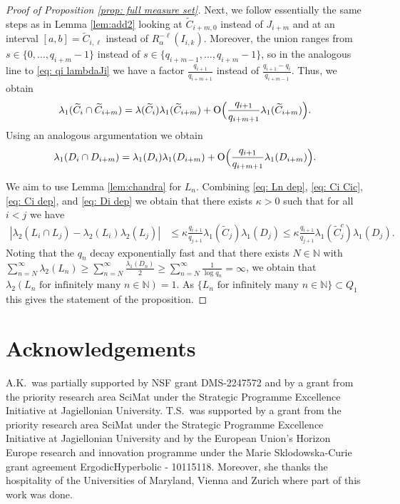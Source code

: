 \documentclass[11pt]{amsart}
\theoremstyle{definition}
\numberwithin{equation}{section}
\def\N{\mathbb{N}}
\begin{document}
\begin{proof}[Proof of Proposition \ref{prop: full measure set}]
Next, we follow essentially the same steps as in Lemma \ref{lem:add2} looking at $\widetilde{C}_{i+m,0}$ instead of $J_{i+m}$ and at an interval $[a,b]=\widetilde{C}_{i,\ell}$ instead of $R_{\alpha}^{-\ell}(I_{i,k})$. Moreover, the union ranges from $s\in \{0,\ldots, q_{i+m}-1\}$ instead of $s\in \{q_{i+m-1},\ldots, q_{i+m}-1\}$, so in the analogous line to \eqref{eq: qi lambdaJi} we have a factor $\frac{q_{i+1}}{q_{i+m+1}}$ instead of $\frac{q_{i+1}-q_i}{q_{i+m-1}}$. Thus, we obtain 
\begin{align}
 \lambda_1(\widetilde{C}_i\cap \widetilde{C}_{i+m})= \lambda(\widetilde{C}_i)\lambda_1(\widetilde{C}_{i+m})+{\rm O}\Big(\frac{q_{i+1}}{q_{ i+m+1}}\lambda_1(\widetilde{C}_{i+m})\Big).\label{eq: Ci dep}
\end{align}
Using an analogous argumentation we obtain 
\begin{align}
 \lambda_1(D_i\cap D_{i+m})= \lambda_1(D_i)\lambda_1(D_{i+m})+{\rm O}\Big(\frac{q_{i+1}}{q_{i+m+1}}\lambda_1(D_{i+m})\Big).\label{eq: Di dep}
\end{align}

We aim to use Lemma \ref{lem:chandra} for $L_n$. Combining \eqref{eq: Ln dep}, \eqref{eq: Ci Cic}, \eqref{eq: Ci dep}, and \eqref{eq: Di dep} we obtain that there exists $\kappa>0$ such that for all $i<j$ we have 
\begin{align*}
 |\lambda_2(L_i\cap L_j)- \lambda_2(L_i)\lambda_2(L_j)|
 &\leq \kappa { \frac{q_{i+1}}{q_{j+1}}} \lambda_1(\widetilde{C}_j)\lambda_1(D_j)
 \leq \kappa {\frac{q_{i+1}}{q_{j+1}}} \lambda_1(\widetilde{C}_j^c)\lambda_1(D_j).
\end{align*}
 Noting that the $q_n$ decay exponentially fast and that there exists $N\in\N$ with $\sum_{n=N}^{\infty}\lambda_2(L_n)\geq \sum_{n=N}^{\infty}\frac{\lambda_1(D_n)}{2}\geq \sum_{n=N}^{\infty}\frac{1}{\log q_n}=\infty$, we obtain that 
$\lambda_2( L_n\text{ for infinitely many }n\in \N)=1$. 
As $\{L_n\text{ for infinitely many }n\in \N\}\subset Q_1$ this gives the statement of the proposition.
\end{proof}



\section*{Acknowledgements}
A.K.\ was partially supported by NSF grant DMS-2247572 and by a
grant from the priority research area SciMat under the Strategic Programme Excellence Initiative at Jagiellonian University.
T.S.\ was supported by a
grant from the priority research area SciMat under the Strategic
Programme Excellence Initiative at Jagiellonian University and by the European Union’s Horizon Europe
research and innovation programme under the Marie Sklodowska-Curie grant agreement ErgodicHyperbolic - 10115118.
Moreover, she thanks the hospitality of the Universities of Maryland, Vienna and Zurich where part of this work was done.
\bigskip
\end{document}
